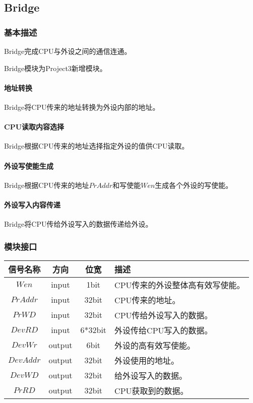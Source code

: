 \documentclass[main.tex]{subfiles}
\begin{document}
\clearpage \subsection{Bridge}
\subsubsection{基本描述}
Bridge完成CPU与外设之间的通信连通。

Bridge模块为Project3新增模块。

\paragraph{地址转换}
Bridge将CPU传来的地址转换为外设内部的地址。

\paragraph{CPU读取内容选择}
Bridge根据CPU传来的地址选择指定外设的值供CPU读取。

\paragraph{外设写使能生成}
Bridge根据CPU传来的地址$PrAddr$和写使能$Wen$生成各个外设的写使能。

\paragraph{外设写入内容传递}
Bridge将CPU传给外设写入的数据传递给外设。

\subsubsection{模块接口}
\begin{center}
    \begin{tabular}[]{c c c l}
        \toprule
        信号名称 & 方向 & 位宽 & 描述 \\
        \midrule
        $Wen$ & input & 1bit & CPU传来的外设整体高有效写使能。 \\
        $PrAddr$ & input & 32bit & CPU传来的地址。 \\
        $PrWD$ & input & 32bit & CPU传给外设写入的数据。 \\
        $DevRD$ & input & 6*32bit & 外设传给CPU写入的数据。\\
        $DevWr$ & output & 6bit & 外设的高有效写使能。\\
        $DevAddr$ & output & 32bit & 外设使用的地址。 \\
        $DevWD$ & output & 32bit & 给外设写入的数据。 \\
        $PrRD$ & output & 32bit & CPU获取到的数据。 \\
        \bottomrule
    \end{tabular}
\end{center}
\end{document}
